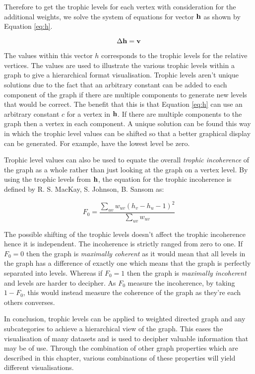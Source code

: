 Therefore to get the trophic levels for each vertex with consideration for the additional weights, we solve the system of equations for vector $\bold{h}$ as shown by Equation \ref{eq:h}.

\begin{equation} \label{eq:h}
\Delta \bold{h} = \bold{v} 
\end{equation}

The values within this vector $h$ corresponds to the trophic levels for the relative vertices. The values are used to illustrate the various trophic levels within a graph to give a hierarchical format visualisation. Trophic levels aren't unique solutions due to the fact that an arbitrary constant can be added to each component of the graph if there are multiple components to generate new levels that would be correct. The benefit that this is that Equation \ref{eq:h} can use an arbitrary constant $c$ for a vertex in $\bold{h}$. If there are multiple components to the graph then a vertex in each component. A unique solution can be found this way in which the trophic level values can be shifted so that a better graphical display can be generated. For example, have the lowest level be zero. 

Trophic level values can also be used to equate the overall \emph{trophic incoherence} of the graph as a whole rather than just looking at the graph on a vertex level. By using the trophic levels from $\bold{h}$, the equation for the trophic incoherence is defined by R. S. MacKay, S. Johnson, B. Sansom\cite{johnson2020digraphs} as:

\begin{equation}
F_0=\frac{\sum_{uv}w_{uv}(h_v-h_u-1)^2}{\sum_{uv}w_{uv}}
\end{equation}

The possible shifting of the trophic levels doesn't affect the trophic incoherence hence it is independent. The incoherence is strictly ranged from zero to one. If $F_0 = 0$  then the graph is \emph{maximally coherent} as it would mean that all levels in the graph has a difference of exactly one which means that the graph is perfectly separated into levels. Whereas if $F_0 = 1$ then the graph is \emph{maximally incoherent} and levels are harder to decipher. As $F_0$ measure the incoherence, by taking $1 - F_0$, this would instead measure the coherence of the graph as they're each others converses. 
\newline

In conclusion, trophic levels can be applied to weighted directed graph and any subcategories to achieve a hierarchical view of the graph. This eases the visualisation of many datasets and is used to decipher valuable information that may be of use. Through the combination of other graph properties which are described in this chapter, various combinations of these properties will yield different visualisations.


